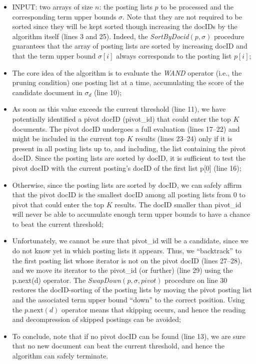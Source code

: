 \begin{itemize}
    \item INPUT: two arrays of size $n$: the posting lists $p$ to be processed and the corresponding term upper bounds $\sigma$. Note that they are not required to be sorted since they will be kept sorted though increasing the docIDs by the algorithm itself (lines 3 and 25). Indeed, the \textit{SortByDocid}$(p,\sigma)$ procedure guarantees that the array of posting lists are sorted by increasing docID and that the term upper bound $\sigma[i]$ always corresponds to the posting list $p[i]$;
    \item The core idea of the algorithm is to evaluate the \textit{WAND} operator (i.e., the pruning condition) one posting list at a time, accumulating the score of the candidate document in $\sigma_d$ (line 10);
    \item As soon as this value exceeds the current threshold (line 11), we have potentially identified a pivot docID (pivot\_id) that could enter the top $K$ documents. The pivot docID undergoes a full evaluation (lines 17–22) and might be included in the current top $K$ results (lines 23–24) only if it is present in all posting lists up to, and including, the list containing the pivot docID. Since the posting lists are sorted by docID, it is sufficient to test the pivot docID with the current posting’s docID of the first list p[0] (line 16);
    \item Otherwise, since the posting lists are sorted by docID, we can safely affirm that the pivot docID is the smallest docID among all posting lists from 0 to pivot that could enter the top $K$ results. The docID smaller than pivot\_id will never be able to accumulate enough term upper bounds to have a chance to beat the current threshold;
    \item Unfortunately, we cannot be sure that pivot\_id will be a candidate, since we do not know yet in which posting lists it appears. Thus, we “backtrack” to the first posting list whose iterator is not on the pivot docID (lines 27–28), and we move its iterator to the pivot\_id (or further) (line 29) using the p.next(d) operator. The \textit{SwapDown}$(p,\sigma,\textit{pivot})$ procedure on line 30 restores the docID-sorting of the posting lists by moving the pivot posting list and the associated term upper bound “down” to the correct position. Using the $p.\text{next}(d)$ operator means that skipping occurs, and hence the reading and decompression of skipped postings can be avoided;
    \item To conclude, note that if no pivot docID can be found (line 13), we are sure that no new document can beat the current threshold, and hence the algorithm can safely terminate.
\end{itemize}

